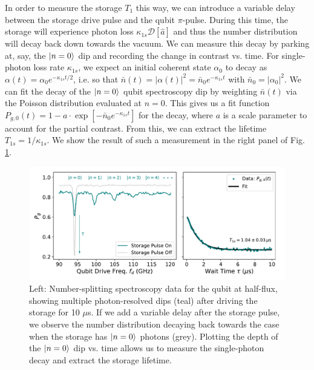 In order to measure the storage $T_1$ this way, we can introduce a variable delay between the storage drive pulse and the qubit $\pi$-pulse. During this time, the storage will experience photon loss $\kappa_{1s}\mathcal{D}[\hat{a}]$ and thus the number distribution will decay back down towards the vacuum. We can measure this decay by parking at, say, the $\lvert n=0\rangle$ dip and recording the change in contrast vs. time. For single-photon loss rate $\kappa_{1s}$, we expect an initial coherent state $\alpha_0$ to decay as $\alpha(t) = \alpha_0 e^{-\kappa_{1s}t/2}$, i.e. so that $\bar{n}(t) = |\alpha(t)|^2 =  \bar{n}_0 e^{-\kappa_{1s}t}$ with $\bar{n}_0 = |\alpha_0|^2$. We can fit the decay of the $\lvert n=0\rangle$ qubit spectroscopy dip by weighting $\bar{n}(t)$ via the Poisson distribution evaluated at $n = 0$. This gives us a fit function $P_{g, 0}(t) = 1-a\cdot\exp[-\bar{n}_0 e^{-\kappa_{1s}t}]$ for the decay, where $a$ is a scale parameter to account for the partial contrast. From this, we can extract the lifetime $T_{1s} = 1/\kappa_{1s}$. We show the result of such a measurement in the right panel of Fig. \ref{fig:4_storage_T1_numsplit}.
\begin{figure}[h]
    \centering
    \includegraphics[width=\linewidth]{Figures/4/storage_T1_numsplit.pdf}
    \caption{Left: Number-splitting spectroscopy data for the qubit at half-flux, showing multiple photon-resolved dips (teal) after driving the storage for 10 $\mu$s. If we add a variable delay after the storage pulse, we observe the number distribution decaying back towards the case when the storage has $\lvert n=0\rangle$ photons (grey). Plotting the depth of the $\lvert n=0\rangle$ dip vs. time allows us to measure the single-photon decay and extract the storage lifetime.}
    \label{fig:4_storage_T1_numsplit}
\end{figure}

